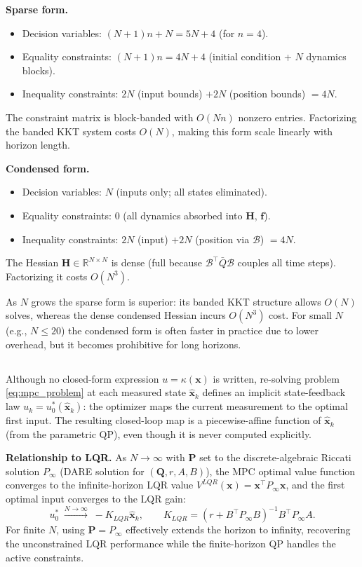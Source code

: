 \textbf{Sparse form.}
\begin{itemize}
    \item Decision variables: $(N+1)n + N = 5N + 4$ (for $n=4$).
    \item Equality constraints: $(N+1)n = 4N+4$ (initial condition + $N$ dynamics blocks).
    \item Inequality constraints: $2N$ (input bounds) $+ 2N$ (position bounds) $= 4N$.
\end{itemize}
The constraint matrix is block-banded with $O(Nn)$ nonzero entries. Factorizing the banded KKT system costs $O(N)$, making this form scale linearly with horizon length.

\textbf{Condensed form.}
\begin{itemize}
    \item Decision variables: $N$ (inputs only; all states eliminated).
    \item Equality constraints: $0$ (all dynamics absorbed into $\mathbf{H}$, $\mathbf{f}$).
    \item Inequality constraints: $2N$ (input) $+ 2N$ (position via $\mathcal{B}$) $= 4N$.
\end{itemize}
The Hessian $\mathbf{H} \in \mathbb{R}^{N\times N}$ is dense (full because $\mathcal{B}^\top\bar{Q}\mathcal{B}$ couples all time steps). Factorizing it costs $O(N^3)$.

As $N$ grows the sparse form is superior: its banded KKT structure allows $O(N)$ solves, whereas the dense condensed Hessian incurs $O(N^3)$ cost. For small $N$ (e.g., $N \leq 20$) the condensed form is often faster in practice due to lower overhead, but it becomes prohibitive for long horizons.

\subsection{}
Although no closed-form expression $u = \kappa(\mathbf{x})$ is written, re-solving problem \eqref{eq:mpc_problem} at each measured state $\hat{\mathbf{x}}_k$ defines an implicit state-feedback law $u_k = u_0^*(\hat{\mathbf{x}}_k)$: the optimizer maps the current measurement to the optimal first input. The resulting closed-loop map is a piecewise-affine function of $\hat{\mathbf{x}}_k$ (from the parametric QP), even though it is never computed explicitly.

\textbf{Relationship to LQR.} As $N \to \infty$ with $\mathbf{P}$ set to the discrete-algebraic Riccati solution $P_\infty$ (DARE solution for $(\mathbf{Q}, r, A, B)$), the MPC optimal value function converges to the infinite-horizon LQR value $V^{LQR}(\mathbf{x}) = \mathbf{x}^\top P_\infty\mathbf{x}$, and the first optimal input converges to the LQR gain:
\begin{equation}
    u_0^* \;\xrightarrow{N\to\infty}\; -K_{LQR}\hat{\mathbf{x}}_k, \qquad K_{LQR} = (r + B^\top P_\infty B)^{-1}B^\top P_\infty A.
\end{equation}
For finite $N$, using $\mathbf{P} = P_\infty$ effectively extends the horizon to infinity, recovering the unconstrained LQR performance while the finite-horizon QP handles the active constraints.

